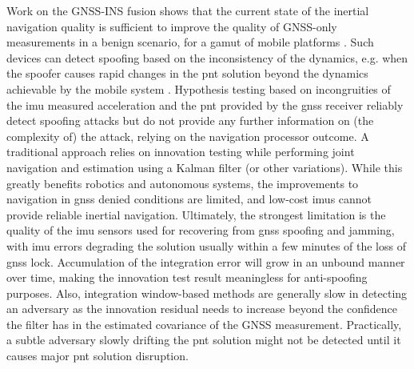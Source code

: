 Work on the GNSS-INS fusion shows that the current state of the inertial navigation quality is sufficient to improve the quality of GNSS-only measurements in a benign scenario, for a gamut of mobile platforms \cite{Sharma2021TimeSynchronizedGD,8915828,Lee2022GNSSFD}. Such devices can detect spoofing based on the inconsistency of the dynamics, e.g. when the spoofer causes rapid changes in the \gls{pnt} solution beyond the dynamics achievable by the mobile system \cite{Curran2017OnTU,Kujurnavi.629}. Hypothesis testing based on incongruities of the \gls{imu} measured acceleration and the \gls{pnt} provided by the \gls{gnss} receiver reliably detect spoofing attacks but do not provide any further information on (the complexity of) the attack, relying on the navigation processor outcome. A traditional approach relies on innovation testing while performing joint navigation and estimation using a Kalman filter (or other variations). While this greatly benefits robotics and autonomous systems, the improvements to navigation in \gls{gnss} denied conditions are limited, and low-cost \gls{imu}s cannot provide reliable inertial navigation. Ultimately, the strongest limitation is the quality of the \gls{imu} sensors used for recovering from \gls{gnss} spoofing and jamming, with \gls{imu} errors degrading the solution usually within a few minutes of the loss of \gls{gnss} lock. Accumulation of the integration error will grow in an unbound manner over time, making the innovation test result meaningless for anti-spoofing purposes. 
Also, integration window-based methods are generally slow in detecting an adversary as the innovation residual needs to increase beyond the confidence the filter has in the estimated covariance of the GNSS measurement. Practically, a subtle adversary slowly drifting the \gls{pnt} solution might not be detected until it causes major \gls{pnt} solution disruption.


